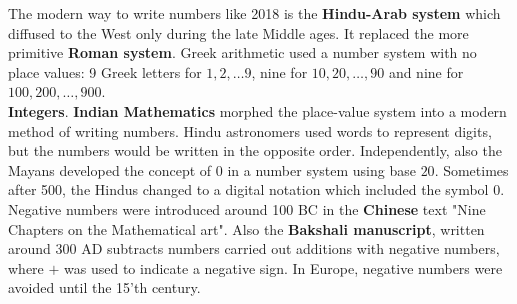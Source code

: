 \documentclass[12pt]{amsart}
\newcounter{example}    \def\example#1{ \item \fontsize{12}{15} \selectfont #1 \fontsize{12}{15} \selectfont }
\begin{document}
The modern way to write numbers like 2018 is the
{\bf Hindu-Arab system} which diffused to the West only during
the late Middle ages. It replaced the more primitive {\bf Roman system}. \cite{SondheimerRogerson}
\label{Roman system}
\label{Hindu-Arab system}
Greek arithmetic used a number system with no place values: 
9 Greek letters for $1,2,\dots 9$, nine for $10,20,\dots,90$ and nine for $100,200,\dots,900$. \\ 

{\bf Integers}.
{\bf Indian Mathematics} morphed the place-value system into a modern method of writing numbers. 
Hindu astronomers used words to represent digits, but the numbers would be written in the opposite order. 
Independently, also the Mayans developed the concept of $0$ in a number system using base $20$. 
Sometimes after 500, the Hindus changed to a digital notation which included the symbol $0$. 
Negative numbers were introduced around 100 BC in the {\bf Chinese} text "Nine Chapters on the Mathematical art".
Also the {\bf Bakshali manuscript}, written around 300 AD subtracts numbers carried out additions
with negative numbers, where $+$ was used to indicate a negative sign.  \cite{Mathbook}
In Europe, negative numbers were avoided until the 15'th century.  \\
\end{document}
